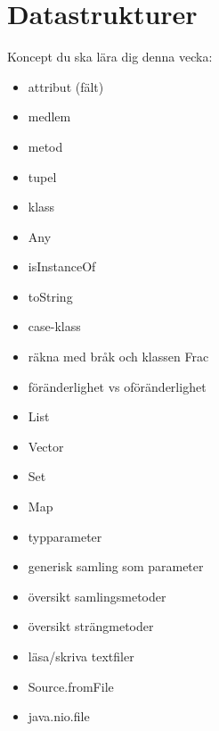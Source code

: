 \chapter{Datastrukturer}\label{chapter:W04}
Koncept du ska lära dig denna vecka:
\begin{multicols}{2}\begin{itemize}[nosep,label={$\square$},leftmargin=*]
\item attribut (fält)
\item medlem
\item metod
\item tupel
\item klass
\item Any
\item isInstanceOf
\item toString
\item case-klass
\item räkna med bråk och klassen Frac
\item föränderlighet vs oföränderlighet
\item List
\item Vector
\item Set
\item Map
\item typparameter
\item generisk samling som parameter
\item översikt samlingsmetoder
\item översikt strängmetoder
\item läsa/skriva textfiler
\item Source.fromFile
\item java.nio.file\end{itemize}\end{multicols}
